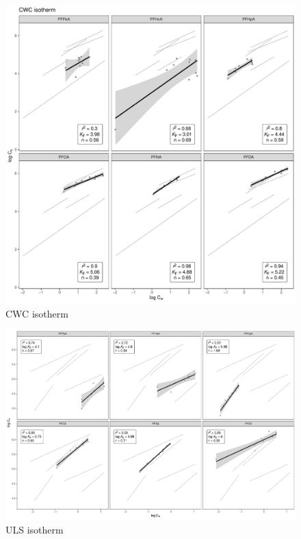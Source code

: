 \begin{figure}
    \centering
    \includegraphics[width=\textwidth]{R/figs/CWC_facet_isotherm.pdf}
    \caption{CWC isotherm}
    \label{fig:CWC_isotherm}
\end{figure}

\begin{figure}
    \centering
    \includegraphics[width=\textwidth]{R/figs/ULS_facet_isotherm.pdf}
    \caption{ULS isotherm}
    \label{fig:ULS_isotherm}
\end{figure}

